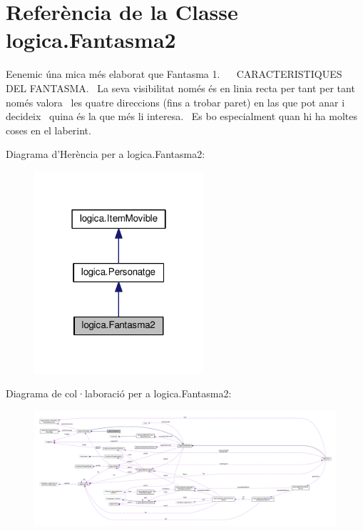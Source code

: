 \hypertarget{classlogica_1_1_fantasma2}{\section{Referència de la Classe logica.\+Fantasma2}
\label{classlogica_1_1_fantasma2}
}


Eenemic úna mica més elaborat que Fantasma 1.~\newline
~\newline
C\+A\+R\+A\+C\+T\+E\+R\+I\+S\+T\+I\+Q\+U\+E\+S D\+E\+L F\+A\+N\+T\+A\+S\+M\+A.~\newline
La seva visibilitat només és en linia recta per tant per tant només valora~\newline
les quatre direccions (fins a trobar paret) en las que pot anar i decideix~\newline
quina és la que més li interesa.~\newline
Es bo especialment quan hi ha moltes coses en el laberint.  




Diagrama d'Herència per a logica.\+Fantasma2\+:
\nopagebreak
\begin{figure}[H]
\begin{center}
\leavevmode
\includegraphics[width=178pt]{classlogica_1_1_fantasma2__inherit__graph}
\end{center}
\end{figure}


Diagrama de col·laboració per a logica.\+Fantasma2\+:
\nopagebreak
\begin{figure}[H]
\begin{center}
\leavevmode
\includegraphics[width=350pt]{classlogica_1_1_fantasma2__coll__graph}
\end{center}
\end{figure}
